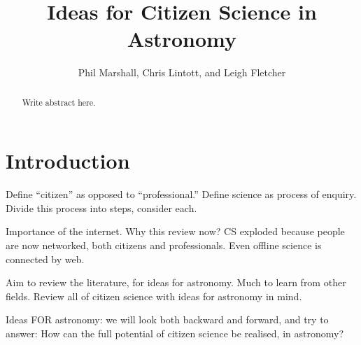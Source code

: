 \documentclass{ar2e}
\begin{document}

\jvol{}
\ARinfo{}

\title{Ideas for Citizen Science in Astronomy}

\author{Phil Marshall,
Chris Lintott, and
Leigh Fletcher
}




\begin{abstract}
Write abstract here.
\end{abstract}

\maketitle


\section{Introduction}
\label{sec:intro}

Define ``citizen'' as opposed to ``professional.'' Define science as process of
enquiry. Divide this process into steps, consider each. 


Importance of the internet. Why this review now? CS exploded because people are 
now networked, both citizens and professionals. Even offline science is
connected by web.

Aim to review the literature, for ideas  for astronomy. Much to learn from other
fields. Review all of  citizen science with ideas for astronomy in mind.

Ideas FOR astronomy: we will look both backward and forward, and try to answer:
How can the full potential of citizen science be realised, in astronomy? 
\end{document}
